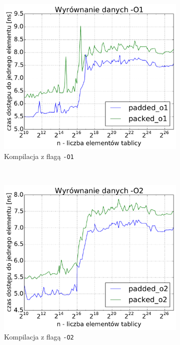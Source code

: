\begin{figure}[!h]
\begin{subfigure}[c]{0.45\textwidth}
        \includegraphics[width=\textwidth]{images/benchs/data_alignment_O1}
        \caption{Kompilacja z flagą \texttt{-O1}}
    \end{subfigure}
    \\
    \begin{subfigure}[c]{0.45\textwidth}
        \centering
        \includegraphics[width=\textwidth]{images/benchs/data_alignment_O2}
        \caption{Kompilacja z flagą \texttt{-O2}}
    \end{subfigure}
    ~
    \begin{subfigure}[c]{0.45\textwidth}

\end{subfigure}
\end{figure}
